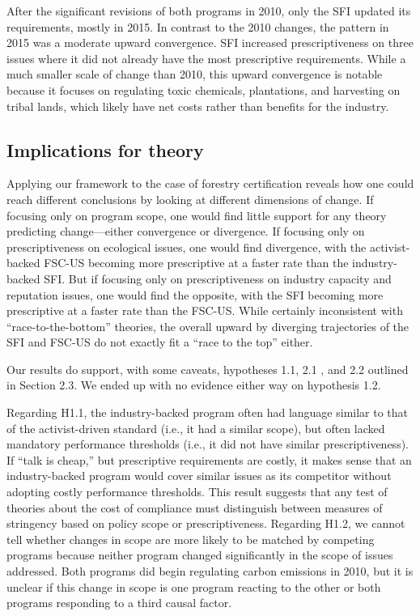 \documentclass[
      12pt,
            Review ]{article}
\begin{document}
After the significant revisions of both programs in 2010, only the SFI
updated its requirements, mostly in 2015. In contrast to the 2010
changes, the pattern in 2015 was a moderate upward convergence. SFI
increased prescriptiveness on three issues where it did not already have
the most prescriptive requirements. While a much smaller scale of change
than 2010, this upward convergence is notable because it focuses on
regulating toxic chemicals, plantations, and harvesting on tribal lands,
which likely have net costs rather than benefits for the industry.

\subsection{Implications for theory}\label{implications-for-theory}

Applying our framework to the case of forestry certification reveals how
one could reach different conclusions by looking at different dimensions
of change. If focusing only on program scope, one would find little
support for any theory predicting change---either convergence or
divergence. If focusing only on prescriptiveness on ecological issues,
one would find divergence, with the activist-backed FSC-US becoming more
prescriptive at a faster rate than the industry-backed SFI. But if
focusing only on prescriptiveness on industry capacity and reputation
issues, one would find the opposite, with the SFI becoming more
prescriptive at a faster rate than the FSC-US. While certainly
inconsistent with ``race-to-the-bottom'' theories, the overall upward by
diverging trajectories of the SFI and FSC-US do not exactly fit a ``race
to the top'' either.

Our results do support, with some caveats, hypotheses 1.1, 2.1 , and 2.2
outlined in Section 2.3. We ended up with no evidence either way on
hypothesis 1.2.

Regarding H1.1, the industry-backed program often had language similar
to that of the activist-driven standard (i.e., it had a similar scope),
but often lacked mandatory performance thresholds (i.e., it did not have
similar prescriptiveness). If ``talk is cheap,'' but prescriptive
requirements are costly, it makes sense that an industry-backed program
would cover similar issues as its competitor without adopting costly
performance thresholds. This result suggests that any test of theories
about the cost of compliance must distinguish between measures of
stringency based on policy scope or prescriptiveness. Regarding H1.2, we
cannot tell whether changes in scope are more likely to be matched by
competing programs because neither program changed significantly in the
scope of issues addressed. Both programs did begin regulating carbon
emissions in 2010, but it is unclear if this change in scope is one
program reacting to the other or both programs responding to a third
causal factor.
\end{document}
